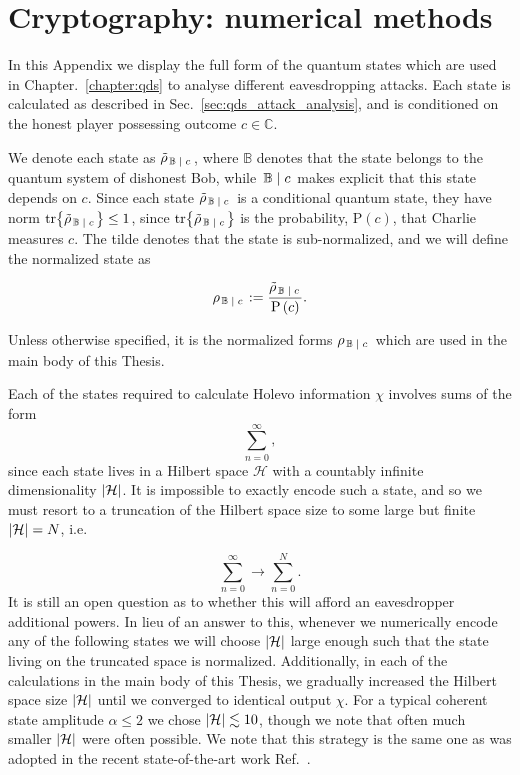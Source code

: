 \chapter{Cryptography: numerical methods}\label{appendix:crpto_numerical_methods}

In this Appendix we display the full form of the quantum states which are used in Chapter.~\ref{chapter:qds} to analyse different eavesdropping attacks. Each state is calculated as described in Sec.~\ref{sec:qds_attack_analysis}, and is conditioned on the honest player possessing outcome $c \in \mathbb{C}$.

We denote each state as $\tilde{\rho}_{\left. \mathbb{B} \; \middle| \; c\right.}$, where $\mathbb{B}$ denotes that the state belongs to the quantum system of dishonest Bob, while $\left. \mathbb{B} \; \middle| \; c \right.$ makes explicit that this state depends on $c$. Since each state $\tilde{\rho}_{\left. \mathbb{B} \; \middle| \; c\right.}$ is a conditional quantum state, they have norm $\tr{\tilde{\rho}_{\left. \mathbb{B} \; \middle| \;c\right.}}\le 1$, since $\tr{\tilde{\rho}_{\left. \mathbb{B} \; \middle| \;c\right.}}$ is the probability, $\text{P}\left(c\right)$, that Charlie measures $c$. The tilde denotes that the state is sub-normalized, and we will define the normalized state as

\begin{equation}
\rho_{\left. \mathbb{B} \; \middle| \; c \right.} := \frac{\tilde{\rho}_{\left. \mathbb{B} \; \middle| \; c\right.}}{\text{P}\left(c\right)}.
\end{equation}

\noindent Unless otherwise specified, it is the normalized forms $\rho_{\left. \mathbb{B} \; \middle| \; c \right.}$ which are used in the main body of this Thesis.

Each of the states required to calculate Holevo information $\chi$ involves sums of the form
\begin{equation}
\sum_{n = 0}^\infty ,
\end{equation}
since each state lives in a Hilbert space $\mathcal{H}$ with a countably infinite dimensionality $\left|\mathcal{H}\right|$. It is impossible to exactly encode such a state, and so we must resort to a truncation of the Hilbert space size to some large but finite $\left|\mathcal{H}\right| = N$, i.e.

\begin{equation}
\sum_{n=0}^\infty \rightarrow \sum_{n=0}^N.
\end{equation}
It is still an open question as to whether this will afford an eavesdropper additional powers. In lieu of an answer to this, whenever we numerically encode any of the following states we will choose $\left|\mathcal{H}\right|$ large enough such that the state living on the truncated space is normalized. Additionally, in each of the calculations in the main body of this Thesis, we gradually increased the Hilbert space size $\left|\mathcal{H}\right|$ until we converged to identical output $\chi$. For a typical coherent state amplitude $\alpha \le 2$ we chose $\left|\mathcal{H}\right| \lesssim 10$, though we note that often much smaller $\left|\mathcal{H}\right|$ were often possible. We note that this strategy is the same one as was adopted in the recent state-of-the-art work Ref.~\cite{Lin2019}.

